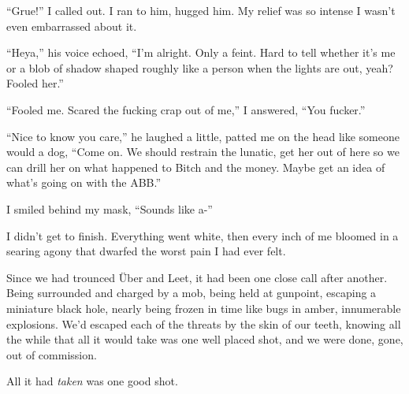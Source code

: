 ``Grue!'' I called out.  I ran to him, hugged him.  My relief was so intense I wasn't even embarrassed about it.



``Heya,'' his voice echoed, ``I'm alright.  Only a feint.  Hard to tell whether it's me or a blob of shadow shaped roughly like a person when the lights are out, yeah?  Fooled her.''



``Fooled me.  Scared the fucking crap out of me,'' I answered, ``You fucker.''



``Nice to know you care,'' he laughed a little, patted me on the head like someone would a dog, ``Come on.  We should restrain the lunatic, get her out of here so we can drill her on what happened to Bitch and the money.  Maybe get an idea of what's going on with the ABB.''



I smiled behind my mask, ``Sounds like a-''



I didn't get to finish.  Everything went white, then every inch of me bloomed in a searing agony that dwarfed the worst pain I had ever felt.



Since we had trounced \"{U}ber and Leet, it had been one close call after another.  Being surrounded and charged by a mob, being held at gunpoint, escaping a miniature black hole, nearly being frozen in time like bugs in amber, innumerable explosions.  We'd escaped each of the threats by the skin of our teeth, knowing all the while that all it would take was one well placed shot, and we were done, gone, out of commission.



All it had \emph{taken} was one good shot.





